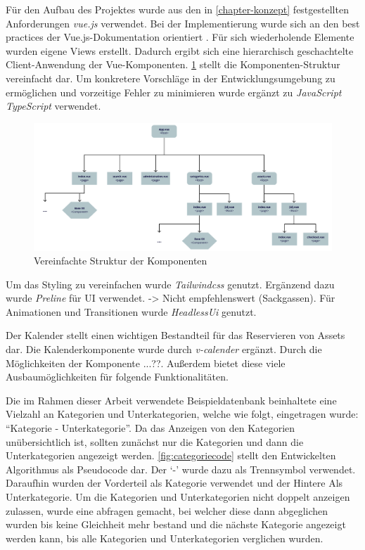 Für den Aufbau des Projektes wurde aus den in \ref{chapter-konzept} festgestellten Anforderungen
\textit{vue.js} verwendet. Bei der Implementierung wurde sich an den best practices der
Vue.js-Dokumentation orientiert . Für sich wiederholende Elemente wurden
eigene Views erstellt. Dadurch ergibt sich eine hierarchisch geschachtelte Client-Anwendung der
Vue-Komponenten. \ref{fig:Komponenten} stellt die Komponenten-Struktur vereinfacht dar. Um
konkretere Vorschläge in der Entwicklungsumgebung zu ermöglichen und vorzeitige Fehler zu minimieren
wurde ergänzt zu \textit{JavaScript} \textit{TypeScript} verwendet.

\begin{figure}[h]
  \centering
  \includegraphics[scale=0.5]{Bilder/struktur.pdf}
  \caption[Vereinfachte Struktur der Komponenten]{Vereinfachte Struktur der Komponenten}
  \label{fig:Komponenten}
\end{figure}

Um das Styling zu vereinfachen wurde \textit{Tailwindcss} genutzt. Ergänzend dazu wurde
\textit{Preline} für UI verwendet. -> Nicht empfehlenswert (Sackgassen). Für Animationen und
Transitionen wurde \textit{HeadlessUi} genutzt.

Der Kalender stellt einen wichtigen Bestandteil für das Reservieren von Assets dar. Die
Kalenderkomponente wurde durch \textit{v-calender} ergänzt. Durch die Möglichkeiten der Komponente
...??. Außerdem bietet diese viele Ausbaumöglichkeiten für folgende Funktionalitäten.

Die im Rahmen dieser Arbeit verwendete Beispieldatenbank beinhaltete eine Vielzahl an Kategorien und
Unterkategorien, welche wie folgt, eingetragen wurde: \enquote{Kategorie - Unterkategorie}. Da das
Anzeigen von den Kategorien unübersichtlich ist, sollten zunächst nur die Kategorien und dann die
Unterkategorien angezeigt werden. \ref{fig:categoriecode} stellt den Entwickelten Algorithmus als
Pseudocode dar. Der \enquote*{-} wurde dazu als Trennsymbol verwendet. Daraufhin wurden der
Vorderteil als Kategorie verwendet und der Hintere Als Unterkategorie. Um die Kategorien und
Unterkategorien nicht doppelt anzeigen zulassen, wurde eine abfragen gemacht, bei welcher diese dann
abgeglichen wurden bis keine Gleichheit mehr bestand und die nächste Kategorie angezeigt werden
kann, bis alle Kategorien und Unterkategorien verglichen wurden.

